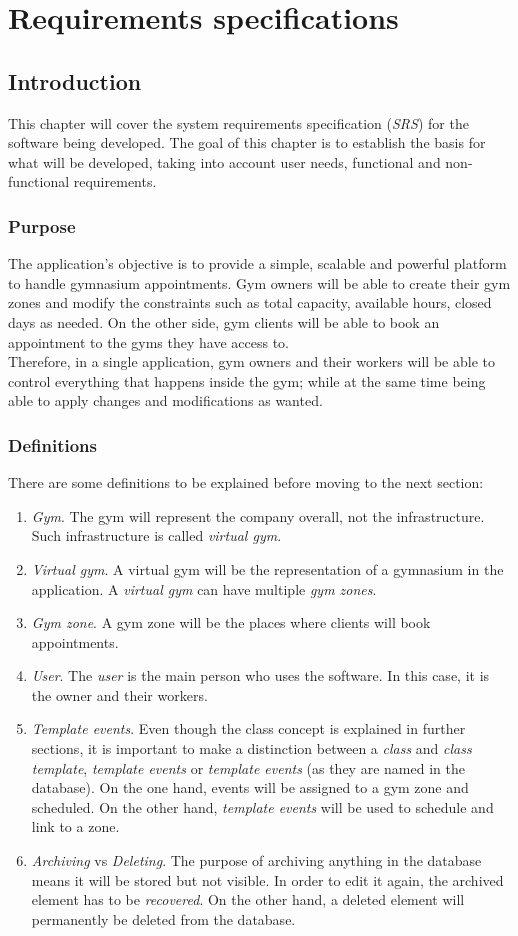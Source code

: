 \documentclass[a4paper, 12pt, oneside]{book}
\begin{document}
\chapter{Requirements specifications}
\section{Introduction}
This chapter will cover the system requirements specification (\emph{SRS}) for the software being developed. The goal of this chapter is to establish the basis for what will be developed, taking into account user needs, functional and non-functional requirements.
\subsection{Purpose}
The application's objective is to provide a simple, scalable and powerful platform to handle gymnasium appointments. Gym owners will be able to create their gym zones and modify the constraints such as total capacity, available hours, closed days as needed. On the other side, gym clients will be able to book an appointment to the gyms they have access to.
\\[8pt]
Therefore, in a single application, gym owners and their workers will be able to control everything that happens inside the gym; while at the same time being able to apply changes and modifications as wanted.
\subsection{Definitions}
There are some definitions to be explained before moving to the next section:
\begin{enumerate}[label = -]
	\item \emph{Gym}. The gym will represent the company overall, not the infrastructure. Such infrastructure is called \emph{virtual gym}.
	\item \emph{Virtual gym}. A virtual gym will be the representation of a gymnasium in the application. A \emph{virtual gym} can have multiple \emph{gym zones}.
	\item \emph{Gym zone}. A gym zone will be the places where clients will book appointments.
	\item \emph{User}. The \emph{user} is the main person who uses the software. In this case, it is the owner and their workers.
	\item \emph{Template events}. Even though the class concept is explained in further sections, it is important to make a distinction between a \emph{class} and \emph{class template}, \emph{template events} or \emph{template events} (as they are named in the database). On the one hand, events will be assigned to a gym zone and scheduled. On the other hand, \emph{template events} will be used to schedule and link to a zone.
	\item \emph{Archiving} vs \emph{Deleting}. The purpose of archiving anything in the database means it will be stored but not visible. In order to edit it again, the archived element has to be \emph{recovered}. On the other hand, a deleted element will permanently be deleted from the database.
\end{enumerate}
\end{document}
